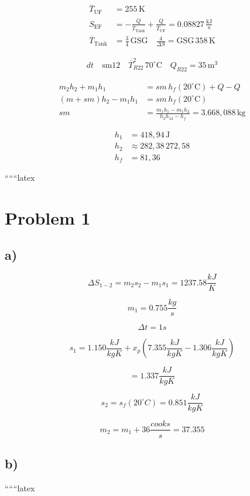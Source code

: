 \begin{align*}
\overline{T}_{\text{UF}} &= 255 \, \text{K} \\
S_{\text{EF}} &= -\frac{\dot{Q}}{\overline{T}_{\text{Tank}}} + \frac{\dot{Q}}{\overline{T}_{\text{UF}}} = 0.08827 \, \frac{\text{kJ}}{\text{s}} \\
\overline{T}_{\text{Tank}} &= \frac{3}{4} \, \text{GSG} \quad \frac{4}{\Delta S} = \text{GSG} \, 358 \, \text{K}
\end{align*}

\begin{align*}
dt \quad \text{sm12} \quad \overline{T}_{R22}^2 \, 70^\circ \text{C} \quad Q_{R22} = 35 \, \text{m}^3
\end{align*}

\begin{align*}
m_2 h_2 + m_1 h_1 &= sm \, h_f (20^\circ \text{C}) + Q - Q \\
(m + sm) h_2 - m_1 h_1 &= sm \, h_f (20^\circ \text{C}) \\
sm &= \frac{m_1 h_1 - m_1 h_2}{h_2 h_{12} - h_f} = 3.668,088 \, \text{kg}
\end{align*}

\begin{align*}
h_1 &= 418,94 \, \text{J} \\
h_2 &\approx 282,38 \, 272,58 \\
h_f &= 81,36
\end{align*}

``````latex


\section*{Problem 1}

\subsection*{a)}

\[
\Delta S_{1-2} = m_2 s_2 - m_1 s_1 = 1237.58 \frac{kJ}{K}
\]

\[
m_1 = 0.755 \frac{kg}{s}
\]

\[
\Delta t = 1 s
\]

\[
s_1 = 1.150 \frac{kJ}{kgK} + x_p (7.355 \frac{kJ}{kgK} - 1.306 \frac{kJ}{kgK})
\]

\[
= 1.337 \frac{kJ}{kgK}
\]

\[
s_2 = s_f (20^\circ C) = 0.851 \frac{kJ}{kgK}
\]

\[
m_2 = m_1 + 36 \frac{cooks}{s} = 37.355
\]

\subsection*{b)}

``````latex


